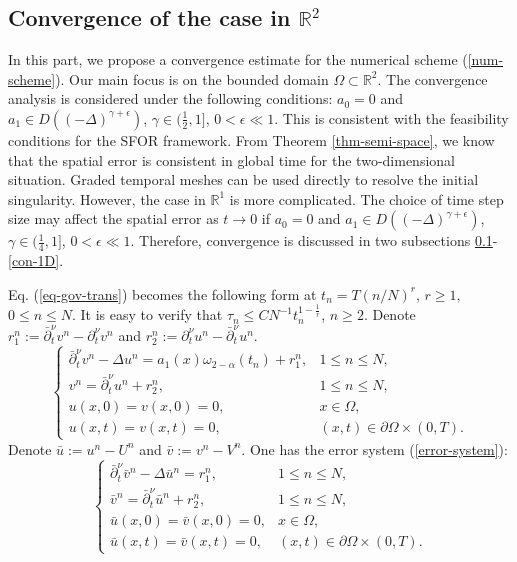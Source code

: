 \documentclass[11pt]{article}
\numberwithin{equation}{section}
\begin{document}
\subsection{Convergence of the case in $\mathbb{R}^2$}\label{con-2D}
In this part, we propose a convergence estimate for the numerical scheme (\ref{num-scheme}). Our main focus is on the bounded domain $\Omega\subset\mathbb{R}^2$.  The convergence analysis is considered under the following conditions: $a_0=0$ and $a_1\in D((-\Delta)^{\gamma+\epsilon})$, $\gamma\in(\frac{1}{2},1]$, $0<\epsilon \ll 1$. This is consistent with the feasibility conditions for the SFOR framework. From Theorem \ref{thm-semi-space}, we know that the spatial error is consistent in global time for the two-dimensional situation. Graded temporal meshes can be used directly to resolve the initial singularity. However, the case in $\mathbb{R}^1$ is more complicated. The choice of time step size may affect the spatial error as $t\rightarrow0$ if $a_0=0$ and $a_1\in D((-\Delta)^{\gamma+\epsilon})$, $\gamma\in(\frac{1}{4},1]$, $0<\epsilon \ll 1$. Therefore, convergence is discussed in two subsections \ref{con-2D}-\ref{con-1D}. 

Eq. (\ref{eq-gov-trans}) becomes the following form at $t_n=T(n/N)^r$, $r\geq1$, $0\le n\le N$. It is easy to verify that $\tau_n\leq CN^{-1}t_n^{1-\frac{1}{r}}$, $n\geq2$. Denote $r_1^n:=\bar\partial_t^\nu v^n-\partial_t^\nu v^n$ and $r_2^n:=\partial_t^\nu u^n-\bar\partial_t^\nu u^n$.
\begin{equation}\nonumber
\begin{cases}
  \bar\partial_t^\nu v^n - \Delta u^n = a_1(x)\omega_{2-\alpha}(t_n)+r_1^n, & 1\le n\le N, \\
  v^n  = \bar\partial_t^\nu u^n + r_2^n, & 1\le n\le N, \\
  u(x,0) = v(x,0)=0, & x \in \Omega, \\
  u(x,t) = v(x,t)=0, & (x,t) \in \partial \Omega \times (0,T).
\end{cases}
\end{equation}
Denote $\bar u:=u^n-U^n$ and $\bar v:=v^n-V^n$. One has the error system (\ref{error-system}):
\begin{equation}\label{error-system}
\begin{cases}
  \bar\partial_t^\nu \bar v^n - \Delta \bar u^n = r_1^n, & 1\le n\le N, \\
  \bar v^n  = \bar\partial_t^\nu \bar u^n + r_2^n, & 1\le n\le N, \\
  \bar u(x,0) = \bar v(x,0)=0, & x \in \Omega, \\
  \bar u(x,t) = \bar v(x,t)=0, & (x,t) \in \partial \Omega \times (0,T).
\end{cases}
\end{equation}
\end{document}
